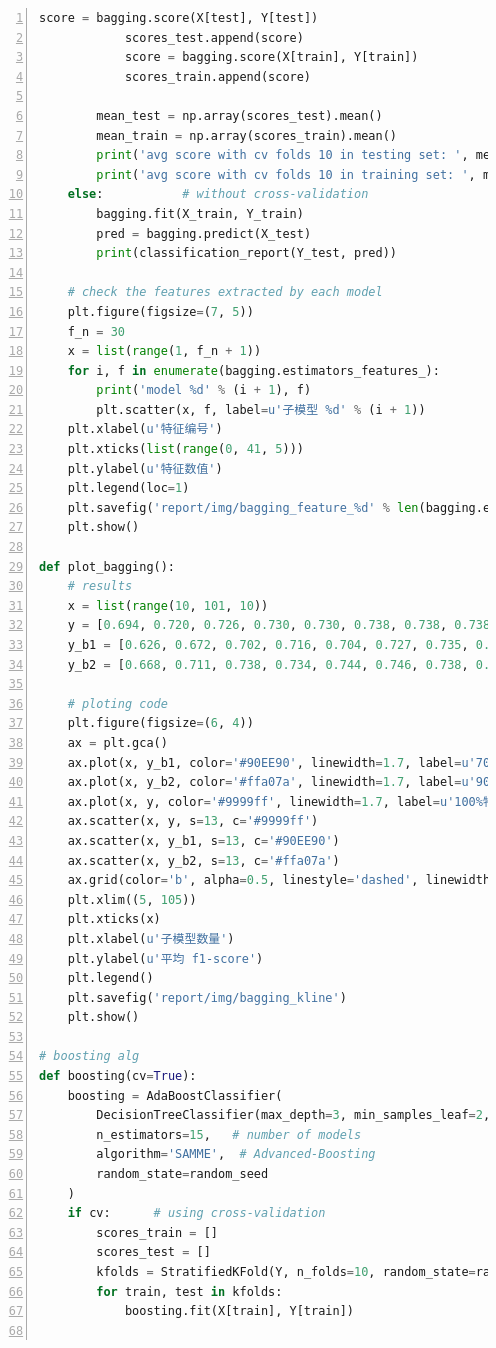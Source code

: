 \documentclass[12pt,a4paper]{article}
\theoremstyle{definition}
\begin{document}
\begin{appendix}
\begin{lstlisting}[language=Python,
	numbers=left,
	keywordstyle=\color{blue!70},
	frame=shadowbox,
	breaklines=True]
            score = bagging.score(X[test], Y[test])
            scores_test.append(score)
            score = bagging.score(X[train], Y[train])
            scores_train.append(score)

        mean_test = np.array(scores_test).mean()
        mean_train = np.array(scores_train).mean()
        print('avg score with cv folds 10 in testing set: ', mean_test)
        print('avg score with cv folds 10 in training set: ', mean_train)
    else:           # without cross-validation
        bagging.fit(X_train, Y_train)
        pred = bagging.predict(X_test)
        print(classification_report(Y_test, pred))

    # check the features extracted by each model
    plt.figure(figsize=(7, 5))
    f_n = 30
    x = list(range(1, f_n + 1))
    for i, f in enumerate(bagging.estimators_features_):
        print('model %d' % (i + 1), f)
        plt.scatter(x, f, label=u'子模型 %d' % (i + 1))
    plt.xlabel(u'特征编号')
    plt.xticks(list(range(0, 41, 5)))
    plt.ylabel(u'特征数值')
    plt.legend(loc=1)
    plt.savefig('report/img/bagging_feature_%d' % len(bagging.estimators_features_))
    plt.show()

def plot_bagging():
    # results
    x = list(range(10, 101, 10))
    y = [0.694, 0.720, 0.726, 0.730, 0.730, 0.738, 0.738, 0.738, 0.738, 0.744]
    y_b1 = [0.626, 0.672, 0.702, 0.716, 0.704, 0.727, 0.735, 0.732, 0.736, 0.738]
    y_b2 = [0.668, 0.711, 0.738, 0.734, 0.744, 0.746, 0.738, 0.730, 0.740, 0.738]

    # ploting code
    plt.figure(figsize=(6, 4))
    ax = plt.gca()
    ax.plot(x, y_b1, color='#90EE90', linewidth=1.7, label=u'70%特征')
    ax.plot(x, y_b2, color='#ffa07a', linewidth=1.7, label=u'90%特征')
    ax.plot(x, y, color='#9999ff', linewidth=1.7, label=u'100%特征')
    ax.scatter(x, y, s=13, c='#9999ff')
    ax.scatter(x, y_b1, s=13, c='#90EE90')
    ax.scatter(x, y_b2, s=13, c='#ffa07a')
    ax.grid(color='b', alpha=0.5, linestyle='dashed', linewidth=0.5)
    plt.xlim((5, 105))
    plt.xticks(x)
    plt.xlabel(u'子模型数量')
    plt.ylabel(u'平均 f1-score')
    plt.legend()
    plt.savefig('report/img/bagging_kline')
    plt.show()

# boosting alg
def boosting(cv=True):
    boosting = AdaBoostClassifier(
        DecisionTreeClassifier(max_depth=3, min_samples_leaf=2, random_state=random_seed),
        n_estimators=15,   # number of models
        algorithm='SAMME',  # Advanced-Boosting
        random_state=random_seed
    )
    if cv:      # using cross-validation
        scores_train = []
        scores_test = []
        kfolds = StratifiedKFold(Y, n_folds=10, random_state=random_seed)
        for train, test in kfolds:
            boosting.fit(X[train], Y[train])


\end{lstlisting}
\end{appendix}
\end{document}
